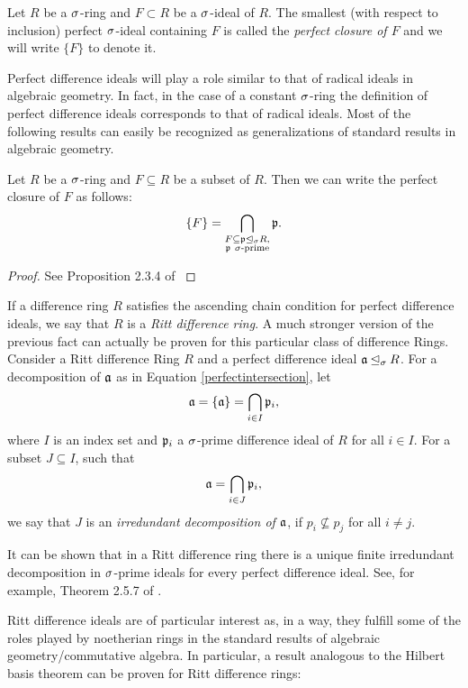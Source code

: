 \begin{defn}
Let $R$ be a $\sigma$-ring and $F \subset R$ be a $\sigma$-ideal of $R$. The smallest (with respect to inclusion) perfect $\sigma$-ideal containing $F$ is called the \emph{perfect closure of $F$} and we will write $\{F\}$ to denote it. 
\end{defn}

Perfect difference ideals will play a role similar to that of radical ideals in algebraic geometry. In fact, in the case of a constant $\sigma$-ring the definition of perfect difference ideals corresponds to that of radical ideals. Most of the following results can easily be recognized as generalizations of standard results in algebraic geometry. 

\begin{theorem}\label{intersectionperfect}
Let $R$ be a $\sigma$-ring and $F \subseteq R$ be a subset of $R$. Then we can write the perfect closure of $F$ as follows:
\begin{equation}\label{perfectintersection} \{F\} = \bigcap_{\substack{F \subseteq \mathfrak{p} \unlhd_{\sigma} R, \\ \mathfrak{p} ~ \sigma\text{-prime}}} \mathfrak{p}. \end{equation}
\begin{proof} See Proposition 2.3.4 of \cite{levin} \end{proof}
\end{theorem}

If a difference ring $R$ satisfies the ascending chain condition for perfect difference ideals, we say that $R$ is a \emph{Ritt difference ring}.
A much stronger version of the previous fact can actually be proven for this  particular class of difference Rings.  Consider a Ritt difference Ring $R$ and a perfect difference ideal $\mathfrak{a} \unlhd_{\sigma} R$. 
For a decomposition of $\mathfrak{a}$ as in Equation \ref{perfectintersection}, let $$\mathfrak{a} = \{ \mathfrak{a} \} = \bigcap_{i \in I} \mathfrak{p}_i,$$ where $I$ is an index set and $\mathfrak{p}_i$ a $\sigma$-prime difference ideal of $R$ for all $i \in I$.
For a subset $J \subseteq I$, such that $$ \mathfrak{a} = \bigcap_{i \in J} \mathfrak{p}_i,$$ we say that $J$ is an \emph{irredundant decomposition of $\mathfrak{a}$},
if $p_i \not \subseteq p_j$ for all $i \neq j.$

It can be shown that in a Ritt difference ring there is a unique finite irredundant decomposition in $\sigma$-prime ideals for every perfect difference ideal. See, for example, Theorem 2.5.7 of \cite{levin}. 

Ritt difference ideals are of particular interest as, in a way, they fulfill some of the roles played by noetherian rings in the standard results of algebraic geometry/commutative algebra.
In particular, a result analogous to the Hilbert basis theorem can be proven for Ritt difference rings:

